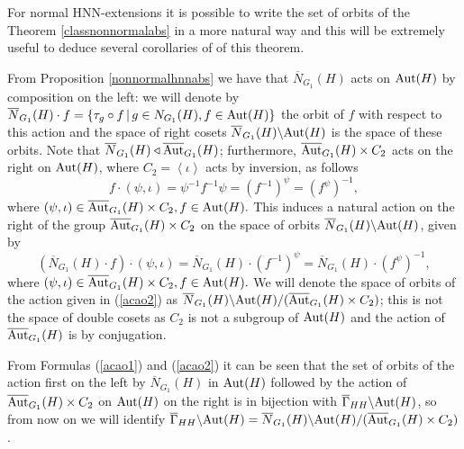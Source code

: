 \documentclass[a4paper,12pt]{article}
\def\aut {{\rm Aut}}
\begin{document}
{For normal HNN-extensions  it is possible to write the set of orbits of the Theorem \ref{classnonnormalabs} in a more natural way and this will be extremely useful to deduce several corollaries of  of this theorem.

From Proposition \ref{nonnormalhnnabs} we have that  $\overline{N}_{G_1}(H)$ acts on $\aut(H)$ by composition on the left: we will denote by $\overline{N}_{G_1}(H) \cdot f =\{\tau_g \circ f \,|\, g \in N_{G_1}(H), f \in \aut(H) \}$  the orbit of $f$ with respect to this action and the space of right cosets $\overline{N}_{G_1}(H) \backslash \aut(H)$ is the space of these orbits. Note that $\overline{N}_{G_1}(H) \triangleleft \overline{\aut}_{G_1}(H)$; furthermore, $ \overline{\aut}_{G_1}(H) \times C_2$ acts on the right on $\aut(H)$, where $C_2=\left\langle \iota\right\rangle$ acts by inversion, as follows 
\begin{equation}\label{acao1} f \cdot (\psi, \iota) = \psi^{-1} f^{-1}\psi = (f^{-1})^{\psi}=\left(f^{\psi}\right)^{-1},\end{equation}
where  $( \psi, \iota) \in  \overline{\aut}_{G_1}(H) \times C_2, f \in \aut(H).$ This induces a natural action on the right of the group $\overline{\aut}_{G_1}(H) \times C_2$ on the space of orbits $\overline{N}_{G_1}(H) \backslash \aut(H)$, given by
\begin{equation} \label{acao2} \left( \overline{N}_{G_1}(H) \cdot f \right) \cdot (\psi, \iota) = \overline{N}_{G_1}(H) \cdot  (f^{-1})^{\psi}=\overline{N}_{G_1}(H) \cdot \left(f^{\psi}\right)^{-1},\end{equation}
where $( \psi, \iota) \in  \overline{\aut}_{G_1}(H) \times C_2, f \in \aut(H).$ We will denote the space of orbits of the action given in (\ref{acao2}) as $\overline{N}_{G_1}(H) \backslash \aut(H)/ ( \overline{\aut}_{G_1}(H) \times C_2)$; this is not the space of double cosets as $C_2$ is not a subgroup of $\aut(H)$ and the action of  $\overline{\aut}_{G_1}(H)$ is by conjugation.

From  Formulas (\ref{acao1}) and (\ref{acao2}) it can be seen that the set of orbits of the action first on the left by $\overline{N}_{G_1}(H)$ in $\aut(H)$ followed by the action of $ \overline{\aut}_{G_1}(H) \times C_2$ on $\aut(H)$ on the right  is in bijection with $\overline{\Gamma}_{HH} \backslash \aut(H)$, so from now on we will identify $\overline{\Gamma}_{HH} \backslash \aut(H) = \overline{N}_{G_1}(H) \backslash \aut(H)/ ( \overline{\aut}_{G_1}(H) \times C_2)$. 

}
\end{document}
